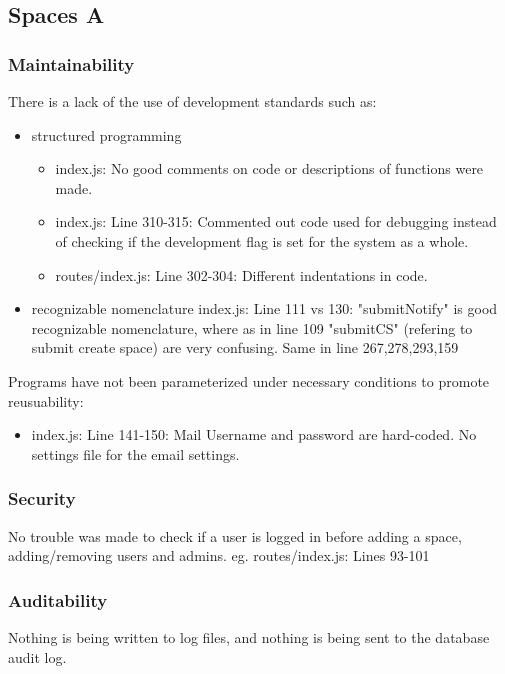 
\subsection{Spaces A}

\subsubsection{Maintainability}
There is a lack of the use of development standards such as:
\begin{itemize}
	\item structured programming
		\begin{itemize}
			\item index.js: No good comments on code or descriptions of functions were made.
			\item index.js: Line 310-315: Commented out code used for debugging instead of checking if the development flag is set for the system as a whole.
			\item routes/index.js: Line 302-304: Different indentations in code.
		\end{itemize}
	\item recognizable nomenclature
index.js: Line 111 vs 130: "submitNotify" is good recognizable nomenclature, where as in line 109 "submitCS" (refering to submit create space) are very confusing. Same in line 267,278,293,159
\end{itemize}

Programs have not been parameterized under necessary conditions to promote reusuability:
\begin{itemize}
	\item index.js: Line 141-150: Mail Username and password are hard-coded. No settings file for the email settings.
	
\end{itemize}

\subsubsection{Security}

No trouble was made to check if a user is logged in before adding a space, adding/removing users and admins. eg. routes/index.js: Lines 93-101

\subsubsection{Auditability}

Nothing is being written to log files, and nothing is being sent to the database audit log.

